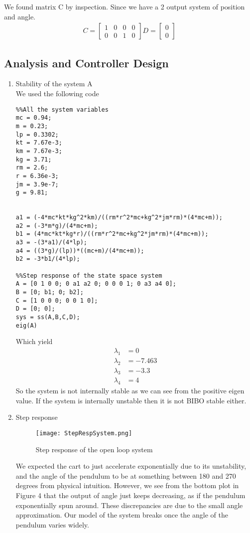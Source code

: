 \documentclass[11pt, twoside, letterpaper]{article}   	%
\begin{document}
\begin{enumerate}
We found matrix C by inspection. Since we have a 2 output system of position
and angle.
\begin{align*}
C = 
\begin{bmatrix}
1 &0 &0 &0\\
0 &0 &1 &0
\end{bmatrix}
D =
\begin{bmatrix}
0\\0
\end{bmatrix}
\end{align*}
\end{enumerate}

\subsection{Analysis and Controller Design}
\begin{enumerate} 

\item Stability of the system A\\
We used the following code
\begin{lstlisting}
%%All the system variables
mc = 0.94;
m = 0.23;
lp = 0.3302;
kt = 7.67e-3;
km = 7.67e-3;
kg = 3.71;
rm = 2.6;
r = 6.36e-3;
jm = 3.9e-7;
g = 9.81;


a1 = (-4*mc*kt*kg^2*km)/((rm*r^2*mc+kg^2*jm*rm)*(4*mc+m));
a2 = (-3*m*g)/(4*mc+m);
b1 = (4*mc*kt*kg*r)/((rm*r^2*mc+kg^2*jm*rm)*(4*mc+m));
a3 = -(3*a1)/(4*lp);
a4 = ((3*g)/(lp))*((mc+m)/(4*mc+m));
b2 = -3*b1/(4*lp);

%%Step response of the state space system
A = [0 1 0 0; 0 a1 a2 0; 0 0 0 1; 0 a3 a4 0];
B = [0; b1; 0; b2];
C = [1 0 0 0; 0 0 1 0];
D = [0; 0];
sys = ss(A,B,C,D);
eig(A)
\end{lstlisting}
Which yield
\begin{align*}
\lambda_1 &= 0\\
\lambda_2 &= -7.463\\
\lambda_3 &= -3.3\\
\lambda_4 &= 4
\end{align*}
So the system is not internally stable as we can see from the positive eigen value. If the system is internally unstable then it is not BIBO stable either.
\newpage
\item Step response
\begin{figure}[htbp]
\begin{center}
\texttt{[image: StepRespSystem.png]}
\caption{Step response of the open loop system}
\label{default}
\end{center}
\end{figure}
\FloatBarrier
We expected the cart to just accelerate exponentially due to its unstability, and the angle of the pendulum to be at something between 180 and 270 degrees from physical intuition. However, we see from the bottom plot in Figure 4 that the output of angle just keeps decreasing, as if the pendulum exponentially spun around. These discrepancies are due to the small angle approximation. Our model of the system breaks once the angle of the pendulum varies widely.


\end{enumerate}
\end{document}
